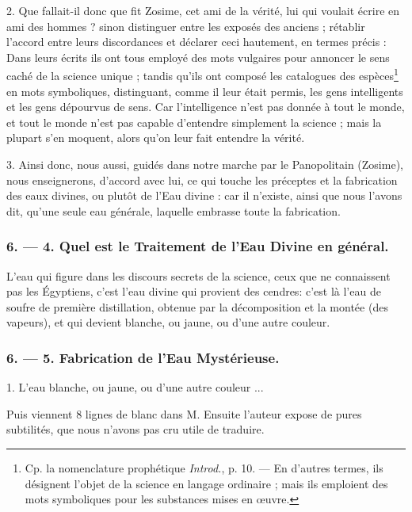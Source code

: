 \documentclass[a4paper, 11pt, oneside, polutonikogreek, french]{article}
\begin{document}
2. Que fallait-il donc que fit Zosime, cet ami de la vérité, lui qui voulait écrire en ami des hommes ? sinon distinguer entre les exposés des anciens ; rétablir l'accord entre leurs discordances et déclarer ceci hautement, en termes précis : Dans leurs écrits ils ont tous employé des mots vulgaires pour annoncer le sens caché de la science unique ; tandis qu'ils ont composé les catalogues des espèces\footnote{Cp. la nomenclature prophétique \emph{Introd.}, p. 10. --- En d'autres termes, ils désignent l'objet de la science en langage ordinaire ; mais ils emploient des mots symboliques pour les substances mises en œuvre.} en mots symboliques, distinguant, comme il leur était permis, les gens intelligents et les gens dépourvus de sens. Car l'intelligence n'est pas donnée à tout le monde, et tout le monde n'est pas capable d'entendre simplement la science ; mais la plupart s'en moquent, alors qu'on leur fait entendre la vérité.

3. Ainsi donc, nous aussi, guidés dans notre marche par le Panopolitain (Zosime), nous enseignerons, d'accord avec lui, ce qui touche les préceptes et la fabrication des eaux divines, ou plutôt de l'Eau divine : car il n'existe, ainsi que nous l'avons dit, qu'une seule eau générale, laquelle embrasse toute la fabrication.

\bigskip
\centerline{\EightStarTaper}
\centerline{\EightStarTaper\EightStarTaper}
\bigskip

\subsubsection{6. --- 4. Quel est le Traitement de l'Eau Divine en général.}

L'eau qui figure dans les discours secrets de la science, ceux que ne connaissent pas les Égyptiens, c'est l'eau divine qui provient des cendres: c'est là l'eau de soufre de première distillation, obtenue par la décomposition et la montée (des vapeurs), et qui devient blanche, ou jaune, ou d'une autre couleur.

\bigskip
\centerline{\EightStarTaper}
\centerline{\EightStarTaper\EightStarTaper}
\bigskip

\subsubsection{6. --- 5. Fabrication de l'Eau Mystérieuse.}

1. L'eau blanche, ou jaune, ou d'une autre couleur ...

Puis viennent 8 lignes de blanc dans M. Ensuite l'auteur expose de pures subtilités, que nous n'avons pas cru utile de traduire.
\end{document}
